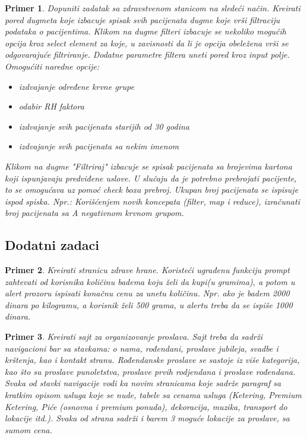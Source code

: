 \documentclass[a4paper]{article}
\newtheorem{primer}{Primer}[section]
\begin{document}
\begin{primer}
Dopuniti zadatak sa zdravstvenom stanicom na sledeći način. 
Kreirati pored dugmeta koje izbacuje spisak svih pacijenata dugme koje vrši filtraciju podataka o pacijentima.
Klikom na dugme filteri izbacuje se nekoliko mogućih opcija kroz select element za koje, u zavisnosti da li je opcija obeležena vrši se odgovarajuće filtriranje.
Dodatne parametre filtera uneti pored kroz input polje.
Omogućiti naredne opcije:
\begin{itemize}
\item izdvajanje određene krvne grupe
\item odabir RH faktora
\item izdvajanje svih pacijenata starijih od 30 godina
\item izdvajanje svih pacijenata sa nekim imenom 
\end{itemize}
Klikom na dugme "Filtriraj" izbacuje se spisak pacijenata sa brojevima kartona koji ispunjavaju predviđene uslove. 
U slučaju da je potrebno prebrojati pacijente, to se omogućava uz pomoć check boxa prebroj. Ukupan broj pacijenata se ispisuje ispod spiska.
Npr.: Korišćenjem novih koncepata (filter, map i reduce), izračunati broj pacijenata sa A negativnom krvnom grupom.
\end{primer}

\subsection{Dodatni zadaci}
\begin{primer}
Kreirati stranicu zdrave hrane. Koristeći ugrađenu funkciju prompt zahtevati od korisnika količinu badema koju želi da kupi(u gramima), a potom u alert prozoru ispisati konačnu cenu za unetu količinu. Npr. ako je badem 2000 dinara po kilogramu, a korisnik želi 500 grama, u alertu treba da se ispiše 1000 dinara.  
\end{primer}

\begin{primer}
Kreirati sajt za organizovanje proslava. Sajt treba da sadrži navigacioni bar sa stavkama: o nama, rođendani, proslave jubileja, svadbe i krštenja, kao i kontakt stranu. Rođendanske proslave se sastoje iz više kategorija, kao što su proslave punoletstva, proslave prvih rodjendana i proslave rođendana. Svaka od stavki navigacije vodi ka novim stranicama koje sadrže paragraf sa kratkim opisom usluga koje se nude, tabele sa cenama usluga (Ketering, Premium Ketering, Piće (osnovna i premium ponuda), dekoracija, muzika, transport do lokacije itd.). Svaka od strana sadrži i barem 3 moguće lokacije za proslave, sa sumom cena.

\end{primer}
\end{document}
